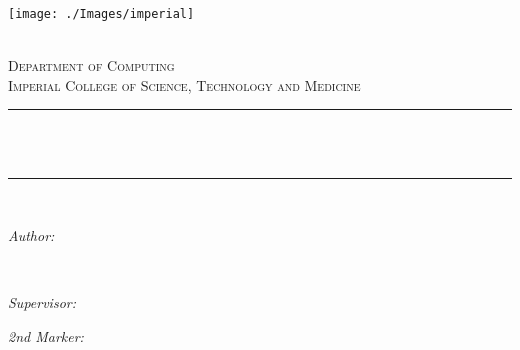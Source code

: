 \begin{titlepage}

    \newcommand{\HRule}{\rule{\linewidth}{0.5mm}} %
    
    
    \texttt{[image: ./Images/imperial]}\\[0.5cm] 
    
    \center %
     
    
    \textsc{\LARGE \reporttype}\\[1.5cm] 
    \textsc{\Large Department of Computing}\\[0.5cm] 
    \textsc{\large Imperial College of Science, Technology and Medicine}\\[0.5cm] 
    
    
    \HRule \\[0.4cm]
    { \huge \bfseries \reporttitle}\\ %
    \HRule \\[1.5cm]
     
    
    \begin{minipage}{0.4\textwidth}
    \begin{flushleft} \large
    \emph{Author:}\\
    \reportauthor %
    \end{flushleft}
    \end{minipage}
    ~
    \begin{minipage}{0.4\textwidth}
    \begin{flushright} \large
    \emph{Supervisor:} \\
    \supervisor %
    \end{flushright}
    \begin{flushright} \large
    \emph{2nd Marker:} \\
    \secondmarker %
    \end{flushright}
    \end{minipage}\\[4cm]
    

\end{titlepage}
